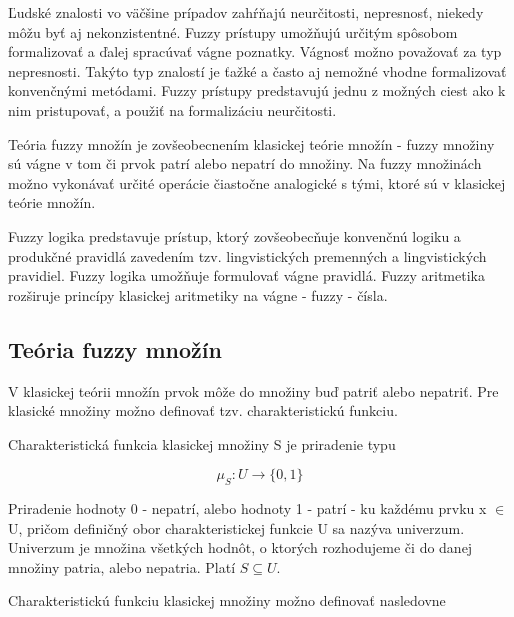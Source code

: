 Ľudské znalosti vo väčšine prípadov zahŕňajú neurčitosti, nepresnosť, niekedy môžu byť aj nekonzistentné. 
Fuzzy prístupy umožňujú určitým spôsobom formalizovať a ďalej spracúvať vágne poznatky. Vágnosť možno považovať za typ nepresnosti.
 Takýto typ znalostí je ťažké a často aj nemožné vhodne formalizovať konvenčnými metódami. Fuzzy prístupy predstavujú jednu z možných ciest ako k nim pristupovať, a použiť na formalizáciu neurčitosti.  

Teória fuzzy množín je zovšeobecnením klasickej teórie množín - fuzzy množiny sú vágne v tom či prvok patrí alebo nepatrí do množiny. 
Na fuzzy množinách možno vykonávať určité operácie čiastočne analogické s tými, ktoré sú v klasickej teórie množín. 

Fuzzy logika predstavuje prístup, ktorý zovšeobecňuje konvenčnú logiku a produkčné pravidlá zavedením tzv. lingvistických premenných a lingvistických pravidiel. 
Fuzzy logika umožňuje formulovať vágne pravidlá. 
Fuzzy aritmetika rozširuje princípy klasickej aritmetiky na vágne - fuzzy - čísla. \cite{gregorUI} 

\subsection{Teória fuzzy množín}

V klasickej teórii množín prvok môže do množiny buď patriť alebo nepatriť. Pre klasické množiny možno definovať tzv. charakteristickú funkciu. 

Charakteristická funkcia klasickej množiny S je priradenie typu 

\begin{equation}\label{charfunkcia}
\mu_S : U \longrightarrow \{0, 1\}
\end{equation}

Priradenie hodnoty 0 - nepatrí, alebo hodnoty 1 - patrí - ku každému prvku x $\in$ U, pričom definičný obor charakteristickej funkcie U sa nazýva univerzum. Univerzum je množina všetkých hodnôt, o ktorých rozhodujeme či do danej množiny patria, alebo nepatria. Platí $S \subseteq U$. 

Charakteristickú funkciu klasickej množiny možno definovať nasledovne

